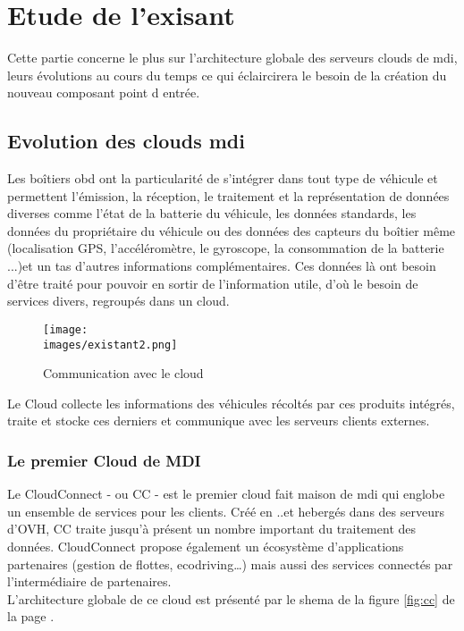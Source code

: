 \section{Etude de l'exisant}
   Cette partie concerne le plus sur l'architecture globale des serveurs clouds de \gls{mdi}, leurs évolutions 
   au cours du temps ce qui éclaircirera le besoin de la création du nouveau composant 
   point d entrée.  

   \subsection{Evolution des clouds \gls{mdi}}
   Les boîtiers \gls{obd} ont la particularité de s’intégrer dans tout type de véhicule et permettent
   l’émission, la réception, le traitement et la représentation de données diverses comme
   l'état de la batterie du véhicule, les données standards, les données du propriétaire du
   véhicule ou des données des capteurs du boîtier même (localisation GPS,
   l’accéléromètre, le gyroscope, la consommation de la batterie ...)et un tas d'autres informations complémentaires.
   Ces données là ont besoin d'être traité pour pouvoir en sortir de l'information utile, d'où le besoin de services divers, regroupés 
   dans un cloud. \\ 
     \begin{figure}[ht]
        \centering
        \texttt{[image: \\images/existant2.png]}
        \caption{Communication avec le cloud}
    \end{figure}
        
        Le Cloud collecte les informations des véhicules récoltés par ces produits intégrés, traite et stocke ces 
   derniers et communique avec les serveurs clients externes.


    \subsubsection{Le premier Cloud de MDI}
       
    
         Le CloudConnect - ou \gls{CC} - est le premier cloud fait maison de \gls{mdi} qui englobe un ensemble 
        de services pour les clients. Créé en ..et hebergés dans des serveurs d'OVH, \gls{CC} traite 
        jusqu'à présent un nombre important du traitement des données. CloudConnect propose également un écosystème d’applications partenaires (gestion de flottes, ecodriving…) 
        mais aussi des services connectés par l’intermédiaire de partenaires. \\ [0.2cm]
        L'architecture globale de ce cloud est présenté par le shema de la figure \ref{fig:cc} de la page \pageref{fig:cc}.

